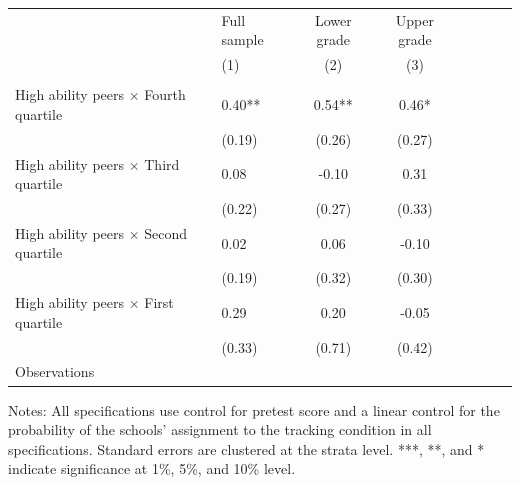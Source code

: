 \begin{center} 
\caption{\small Differential effect of peers by baseline achievement quartiles} 
\label{tab:peerfx} 
\begin{small}
\begin{threeparttable}
\begin{tabular} {@{} l l c c c c c c  @{}} \toprule \toprule
& Full sample & Lower grade & Upper grade  \\
& (1) & (2) & (3) \\ \midrule 
\\
 High ability peers  $\times$ Fourth quartile      &  0.40**  &  0.54**  &  0.46*   \\
             &  (0.19)  &  (0.26)  &  (0.27)   \\
 High ability peers $\times$ Third quartile      &  0.08  &  -0.10  &  0.31   \\
             &  (0.22)  &  (0.27)  &  (0.33)   \\
 High ability peers  $\times$ Second quartile      &  0.02  &  0.06  &  -0.10   \\
             &  (0.19)  &  (0.32)  &  (0.30)   \\
 High ability peers $\times$ First quartile      &  0.29  &  0.20  &  -0.05   \\
             &  (0.33)  &  (0.71)  &  (0.42)   \\
\midrule
Observations   \\
\bottomrule
\end{tabular}
\begin{tablenotes}
\item Notes: All specifications use control for pretest score and a linear control for the probability of the schools’ assignment to the tracking condition in all specifications. Standard errors are clustered at the strata level.  ***, **, and * indicate significance at 1\%, 5\%, and 10\% level. \end{tablenotes}
\end{threeparttable}
\end{small}
\end{center}
\clearpage
